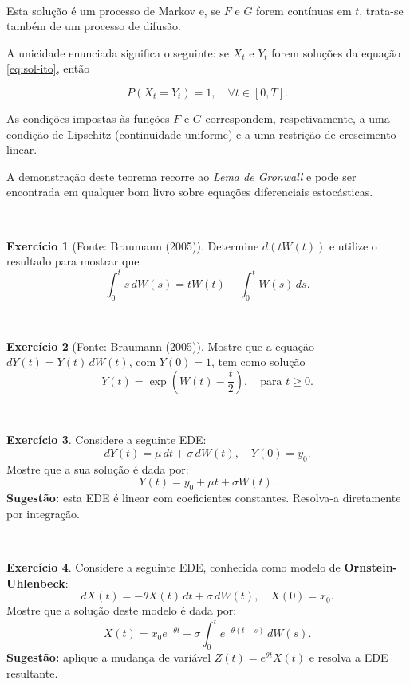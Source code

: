 \documentclass[
  11pt,
  a4paper,
]{book}
\theoremstyle{definition}
\theoremstyle{definition}
\theoremstyle{definition}
\newtheorem{exercise}{Exercício}[chapter]
\theoremstyle{definition}
\theoremstyle{remark}
\begin{document}
\(\,\)

Esta solução é um processo de Markov e, se \(F\) e \(G\) forem contínuas em \(t\), trata-se também de um processo de difusão.

A unicidade enunciada significa o seguinte: se \(X_t\) e \(Y_t\) forem soluções da equação \eqref{eq:sol-ito}, então

\[
P(X_t = Y_t) = 1, \quad \forall t \in [0, T].
\]

As condições impostas às funções \(F\) e \(G\) correspondem, respetivamente, a uma condição de Lipschitz (continuidade uniforme) e a uma restrição de crescimento linear.

A demonstração deste teorema recorre ao \emph{Lema de Gronwall} e pode ser encontrada em qualquer bom livro sobre equações diferenciais estocásticas.

\(\,\)

\begin{exercise}[Fonte: Braumann (2005)]
Determine \(d(tW(t))\) e utilize o resultado para mostrar que
\[
\int_0^t s \, dW(s) = tW(t) - \int_0^t W(s)\, ds.
\]
\end{exercise}

\(\,\)

\begin{exercise}[Fonte: Braumann (2005)]
Mostre que a equação \(dY(t) = Y(t)\, dW(t)\), com \(Y(0) = 1\), tem como solução
\[
Y(t) = \exp\left(W(t) - \frac{t}{2}\right), \quad \text{para } t \geq 0.
\]
\end{exercise}

\(\,\)

\begin{exercise}
Considere a seguinte EDE:
\[
dY(t) = \mu\,dt + \sigma\,dW(t), \quad Y(0) = y_0.
\]
Mostre que a sua solução é dada por:
\[
Y(t) = y_0 + \mu t + \sigma W(t).
\]
\textbf{Sugestão:} esta EDE é linear com coeficientes constantes. Resolva-a diretamente por integração.
\end{exercise}

\(\,\)

\begin{exercise}
Considere a seguinte EDE, conhecida como modelo de \textbf{Ornstein-Uhlenbeck}:
\[
dX(t) = -\theta X(t)\,dt + \sigma\,dW(t), \quad X(0) = x_0.
\]
Mostre que a solução deste modelo é dada por:
\[
X(t) = x_0 e^{-\theta t} + \sigma \int_0^t e^{-\theta (t-s)}\,dW(s).
\]
\textbf{Sugestão:} aplique a mudança de variável \(Z(t) = e^{\theta t} X(t)\) e resolva a EDE resultante.
\end{exercise}
\end{document}

